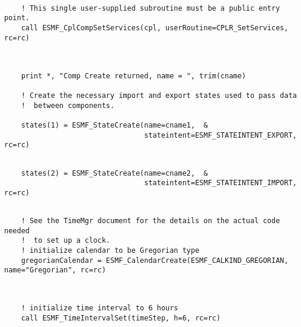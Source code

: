 
 \begin{verbatim}

    ! This single user-supplied subroutine must be a public entry point.
    call ESMF_CplCompSetServices(cpl, userRoutine=CPLR_SetServices, rc=rc)
 
\end{verbatim}
 

 \begin{verbatim}

    print *, "Comp Create returned, name = ", trim(cname)

    ! Create the necessary import and export states used to pass data
    !  between components.

    states(1) = ESMF_StateCreate(name=cname1,  &
                                 stateintent=ESMF_STATEINTENT_EXPORT, rc=rc)
 
\end{verbatim}
 

 \begin{verbatim}
    states(2) = ESMF_StateCreate(name=cname2,  &
                                 stateintent=ESMF_STATEINTENT_IMPORT, rc=rc)
 
\end{verbatim}
 

 \begin{verbatim}
    ! See the TimeMgr document for the details on the actual code needed
    !  to set up a clock.
    ! initialize calendar to be Gregorian type
    gregorianCalendar = ESMF_CalendarCreate(ESMF_CALKIND_GREGORIAN, name="Gregorian", rc=rc)
 
\end{verbatim}
 

 \begin{verbatim}

    ! initialize time interval to 6 hours
    call ESMF_TimeIntervalSet(timeStep, h=6, rc=rc)
 
\end{verbatim}
 

